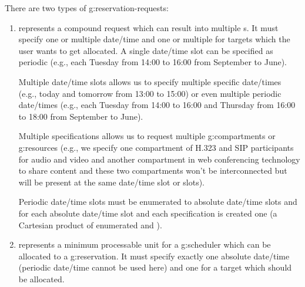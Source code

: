 There are two types of \glspl{g:reservation-request}:
\begin{enumerate}
\item {} represents a compound request which can result into multiple s. It must specify one or multiple date/time  and one or multiple  for targets which the user wants to get allocated. A single date/time slot can be specified as periodic (e.g., each Tuesday from 14:00 to 16:00 from September to June). 

Multiple date/time slots allows us to specify multiple specific date/times (e.g., today and tomorrow from 13:00 to 15:00) or even multiple periodic date/times (e.g., each Tuesday from 14:00 to 16:00 and Thursday from 16:00 to 18:00 from September to June).

Multiple specifications allows us to request multiple \glspl{g:compartment} or \glspl{g:resource} (e.g., we specify one compartment of H.323 and SIP participants for audio and video and another compartment in web conferencing technology to share content and these two compartments won't be interconnected but will be present at the same date/time slot or slots).

Periodic date/time slots must be enumerated to absolute date/time slots and for each absolute date/time slot and each specification is created one  (a Cartesian product of enumerated  and ).


\item {} represents a minimum processable unit for a \gls{g:scheduler} which can be allocated to a \gls{g:reservation}. It must specify exactly one absolute date/time  (periodic date/time cannot be used here) and one  for a target which should be allocated.
\end{enumerate}

